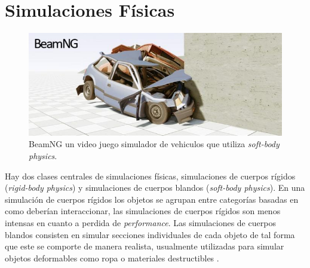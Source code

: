 \section{Simulaciones Físicas}
\setlength\intextsep{0pt}
\begin{figure}
\includegraphics[width=\linewidth]{media/beamng_gamephysics.jpg}
\caption{BeamNG un video juego simulador de vehiculos que utiliza \emph{soft-body physics}.}
\label{fig:beamng}
\end{figure}
Hay dos clases centrales de simulaciones físicas, simulaciones de cuerpos rígidos (\emph{rigid-body physics}) y simulaciones de cuerpos blandos (\emph{soft-body physics}). En una simulación de cuerpos rígidos los objetos se agrupan entre categorías basadas en como deberían interaccionar, las simulaciones de cuerpos rígidos son menos intensas en cuanto a perdida de \emph{performance}. Las simulaciones de cuerpos blandos consisten en simular secciones individuales de cada objeto de tal forma que este se comporte de manera realista, usualmente utilizadas para simular objetos deformables como ropa o materiales destructibles \cite{ian_gamephysics}.
